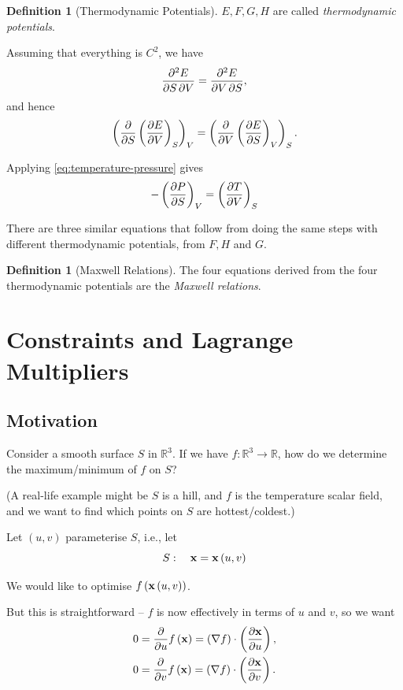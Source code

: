 \documentclass[11pt]{article}
\numberwithin{equation}{section}
\theoremstyle{definition}
\newtheorem{definition}[theorem]{Definition}
\theoremstyle{remark}
\newcommand{\pqty}[1]{\left(#1\right)}
\newcommand{\functiondomain}[3]{#1:#2\to #3}
\newcommand{\RR}{\mathbb{R}}
\newcommand{\grad}{\nabla}
\newcommand{\vdot}{\cdot}
\newcommand{\contClass}[1]{C^{#1}}
\begin{document}
\begin{definition}[Thermodynamic Potentials]\label{variation-unit-0032}
    \(E, F, G, H\) are called \emph{thermodynamic potentials}.
\end{definition}

Assuming that everything is \(\contClass{2}\), we have
\[
    \pdv{E}{S}{V} = \pdv{E}{V}{S},
\]
and hence
\[
    \pqty{\pdv{S} \pqty{\pdv{E}{V}}_S}_{V} = \pqty{\pdv{V} \pqty{\pdv{E}{S}}_{V}}_{S}.
\]

Applying \autoref{eq:temperature-pressure} gives
\[
    - \pqty{\pdv{P}{S}}_{V} = \pqty{\pdv{T}{V}}_{S}
\]

There are three similar equations that follow from doing the same steps with different thermodynamic potentials, from \(F, H\) and \(G\).

\begin{definition}[Maxwell Relations]\label{variation-unit-0033}
    The four equations derived from the four thermodynamic potentials are the \emph{Maxwell relations}.
\end{definition}

\section{Constraints and Lagrange Multipliers}

\subsection{Motivation}

Consider a smooth surface \(S\) in \(\RR^3\). If we have \(\functiondomain{f}{\RR^3}{\RR}\), how do we determine the maximum/minimum of \(f\) on \(S\)?

(A real-life example might be \(S\) is a hill, and \(f\) is the temperature scalar field, and we want to find which points on \(S\) are hottest/coldest.)

Let \(\pqty{u, v}\) parameterise \(S\), i.e., let
\[
    S: \quad \vb{x} = \vb{x} \pqty{u, v}
\]

We would like to optimise \(f\pqty{\vb{x} \pqty{u, v}}\).

But this is straightforward -- \(f\) is now effectively in terms of \(u\) and \(v\), so we want
\begin{align*}
    0 &= \pdv{u} f\pqty{\vb{x}} = \pqty{\grad f} \vdot \pqty{\pdv{\vb{x}}{u}}, \\
    0 &= \pdv{v} f\pqty{\vb{x}} = \pqty{\grad f} \vdot \pqty{\pdv{\vb{x}}{v}}.
\end{align*}
\end{document}

